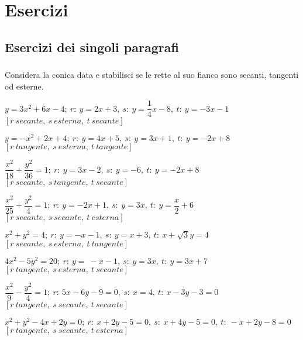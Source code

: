 
\section{Esercizi}

\subsection{Esercizi dei singoli paragrafi}

\subsubsection*{}

\begin{esercizio}
  \label{ese:div.003}
  Considera la conica data e stabilisci se le rette al suo fianco 
sono secanti, tangenti od esterne.
  \begin{enumeratea}
\item \(y=3 x^{2} +6x-4;~r:~y=2x+3,~s:~y=\dfrac{1}{4}x-8,~t:~y=-3x-1\)\\ 
\hfill  \(\left[r~secante,~s ~esterna,~ t~secante\right]\)
\item \(y=-x^{2}+2x+4;~r:~y=4x+5,~s:~y=3x+1,~t:~y=-2x+8\)\\
\hfill \(\left[r~tangente,~s~esterna,~t~tangente\right]\)
\item \(\dfrac{x^{2}}{18}+\dfrac{y^{2}}{36}=1;~
r:~y=3x-2,~s:~y=-6,~t:~y=-2x+8\)\\
\hfill \(\left[r~secante,~s~tangente,~t~secante\right]\)
\item \(\dfrac{x^{2}}{25}+\dfrac{y^{2}}{4}=1;~r:~y=-2x+1,~s:~y=3x,~t:~y= 
\dfrac{x}{2} +6\)\\
\hfill \(\left[r~secante,~s~secante,~t~esterna\right]\)
\item \( x^{2}+y^{2}=4;~r:~y=-x-1,~s:~y=x+3,~t:~x+\sqrt{3}y=4\)\\
\hfill \(\left[r~secante,~s~esterna,~t~tangente\right]\)
\item \(4 x^{2}-5 y^{2}=20;~r:~y=~-x-1,~s:~y=3x,~t:~y=3x+7\)\\
\hfill \(\left[r~tangente,~s~esterna,~t~secante\right]\)
\item \(\dfrac{x^{2}}{9}-\dfrac{y^{2}}{4}=1;~r:~5x-6y-9=0,~s:~x=4,~t:~ 
x-3y-3=0\)\\
\hfill \(\left[r~tangente,~s~secante,~t~secante\right]\)
\item \(x^{2}+y^{2}-4x+2y=0;~r:~x+2y-5=0,~s:~x+4y-5=0,~t:~-x+2y-8=0\)\\
\hfill \(\left[r~tangente,~s~secante,~t~esterna\right]\)
\end{enumeratea}
\end{esercizio}

